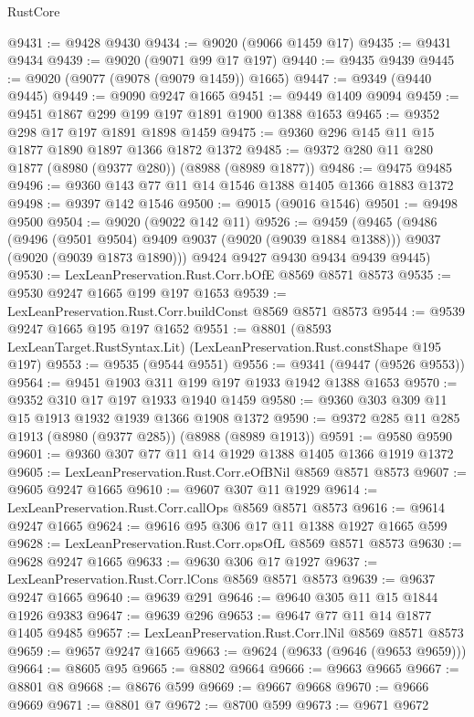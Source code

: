 \begin{lexlean}{RustCore}
\begin{coremodule}
@9431 := @9428 @9430
@9434 := @9020 (@9066 @1459 @17)
@9435 := @9431 @9434
@9439 := @9020 (@9071 @99 @17 @197)
@9440 := @9435 @9439
@9445 := @9020 (@9077 (@9078 (@9079 @1459)) @1665)
@9447 := @9349 (@9440 @9445)
@9449 := @9090 @9247 @1665
@9451 := @9449 @1409 @9094
@9459 := @9451 @1867 @299 @199 @197 @1891 @1900 @1388 @1653
@9465 := @9352 @298 @17 @197 @1891 @1898 @1459
@9475 := @9360 @296 @145 @11 @15 @1877 @1890 @1897 @1366 @1872 @1372
@9485 := @9372 @280 @11 @280 @1877 (@8980 (@9377 @280)) (@8988 (@8989 @1877))
@9486 := @9475 @9485
@9496 := @9360 @143 @77 @11 @14 @1546 @1388 @1405 @1366 @1883 @1372
@9498 := @9397 @142 @1546
@9500 := @9015 (@9016 @1546)
@9501 := @9498 @9500
@9504 := @9020 (@9022 @142 @11)
@9526 := @9459
    (@9465
      (@9486
        (@9496 (@9501 @9504) @9409 @9037 (@9020 (@9039 @1884 @1388)))
        @9037
        (@9020 (@9039 @1873 @1890)))
      @9424
      @9427
      @9430
      @9434
      @9439
      @9445)
@9530 := LexLeanPreservation.Rust.Corr.bOfE @8569 @8571 @8573
@9535 := @9530 @9247 @1665 @199 @197 @1653
@9539 := LexLeanPreservation.Rust.Corr.buildConst @8569 @8571 @8573
@9544 := @9539 @9247 @1665 @195 @197 @1652
@9551 := @8801 (@8593 LexLeanTarget.RustSyntax.Lit) (LexLeanPreservation.Rust.constShape @195 @197)
@9553 := @9535 (@9544 @9551)
@9556 := @9341 (@9447 (@9526 @9553))
@9564 := @9451 @1903 @311 @199 @197 @1933 @1942 @1388 @1653
@9570 := @9352 @310 @17 @197 @1933 @1940 @1459
@9580 := @9360 @303 @309 @11 @15 @1913 @1932 @1939 @1366 @1908 @1372
@9590 := @9372 @285 @11 @285 @1913 (@8980 (@9377 @285)) (@8988 (@8989 @1913))
@9591 := @9580 @9590
@9601 := @9360 @307 @77 @11 @14 @1929 @1388 @1405 @1366 @1919 @1372
@9605 := LexLeanPreservation.Rust.Corr.eOfBNil @8569 @8571 @8573
@9607 := @9605 @9247 @1665
@9610 := @9607 @307 @11 @1929
@9614 := LexLeanPreservation.Rust.Corr.callOps @8569 @8571 @8573
@9616 := @9614 @9247 @1665
@9624 := @9616 @95 @306 @17 @11 @1388 @1927 @1665 @599
@9628 := LexLeanPreservation.Rust.Corr.opsOfL @8569 @8571 @8573
@9630 := @9628 @9247 @1665
@9633 := @9630 @306 @17 @1927
@9637 := LexLeanPreservation.Rust.Corr.lCons @8569 @8571 @8573
@9639 := @9637 @9247 @1665
@9640 := @9639 @291
@9646 := @9640 @305 @11 @15 @1844 @1926 @9383
@9647 := @9639 @296
@9653 := @9647 @77 @11 @14 @1877 @1405 @9485
@9657 := LexLeanPreservation.Rust.Corr.lNil @8569 @8571 @8573
@9659 := @9657 @9247 @1665
@9663 := @9624 (@9633 (@9646 (@9653 @9659)))
@9664 := @8605 @95
@9665 := @8802 @9664
@9666 := @9663 @9665
@9667 := @8801 @8
@9668 := @8676 @599
@9669 := @9667 @9668
@9670 := @9666 @9669
@9671 := @8801 @7
@9672 := @8700 @599
@9673 := @9671 @9672

\end{coremodule}
\end{lexlean}
